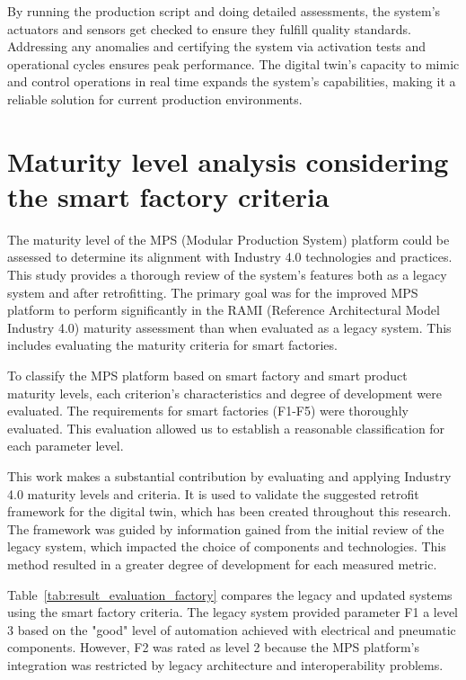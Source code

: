 \documentclass[journal]{IEEEtran}
\begin{document}
By running the production script and doing detailed assessments, the system's actuators and sensors get checked to ensure they fulfill quality standards. Addressing any anomalies and certifying the system via activation tests and operational cycles ensures peak performance. The digital twin's capacity to mimic and control operations in real time expands the system's capabilities, making it a reliable solution for current production environments.

\section{Maturity level analysis considering the smart factory criteria}
\label{sec:results_2}

The maturity level of the MPS (Modular Production System) platform could be assessed to determine its alignment with Industry 4.0 technologies and practices. This study provides a thorough review of the system's features both as a legacy system and after retrofitting. The primary goal was for the improved MPS platform to perform significantly in the RAMI (Reference Architectural Model Industry 4.0) maturity assessment than when evaluated as a legacy system. This includes evaluating the maturity criteria for smart factories.

To classify the MPS platform based on smart factory and smart product maturity levels, each criterion's characteristics and degree of development were evaluated. The requirements for smart factories (F1-F5) were thoroughly evaluated. This evaluation allowed us to establish a reasonable classification for each parameter level.

This work makes a substantial contribution by evaluating and applying Industry 4.0 maturity levels and criteria. It is used to validate the suggested retrofit framework for the digital twin, which has been created throughout this research. The framework was guided by information gained from the initial review of the legacy system, which impacted the choice of components and technologies. This method resulted in a greater degree of development for each measured metric.

Table~\ref{tab:result_evaluation_factory} compares the legacy and updated systems using the smart factory criteria. The legacy system provided parameter F1 a level 3 based on the "good" level of automation achieved with electrical and pneumatic components. However, F2 was rated as level 2 because the MPS platform's integration was restricted by legacy architecture and interoperability problems.
\end{document}
